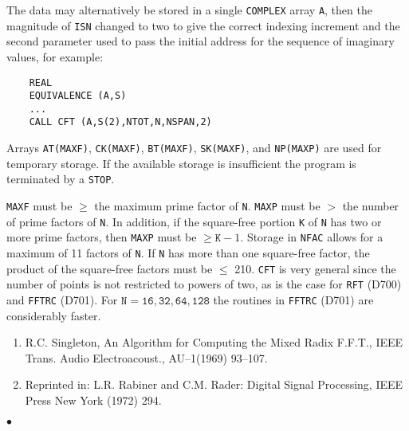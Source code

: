 The data may alternatively be stored in a single {\tt COMPLEX}
array {\tt A}, then the magnitude of {\tt ISN} changed to two to give the
correct indexing increment and the second parameter used to pass
the initial address for the sequence of imaginary values, for
example:
\begin{verbatim}
    REAL
    EQUIVALENCE (A,S)
    ...
    CALL CFT (A,S(2),NTOT,N,NSPAN,2)
\end{verbatim}
Arrays {\tt AT(MAXF)}, {\tt CK(MAXF)}, {\tt BT(MAXF)}, {\tt SK(MAXF)},
and {\tt NP(MAXP)} are used for temporary storage. If the available
storage is insufficient the program is terminated by a {\tt STOP}.
\par
{\tt MAXF}
must be $\geq $ the maximum prime factor of {\tt N}. {\tt MAXP} must be
$>$ the number of prime factors of {\tt N}. In addition, if the
square-free portion {\tt K} of {\tt N} has two or more prime factors,
then {\tt MAXP} must be $\geq \mathtt{K}-1$. Storage in {\tt NFAC} allows
for a maximum of 11 factors of {\tt N}. If {\tt N} has more than one
square-free factor, the product of the square-free factors must be
$\leq$ 210.
\Notes
{\tt CFT} is very general since
the number of points is not restricted to powers of two, as is the
case for {\tt RFT} (D700) and {\tt FFTRC} (D701).
For $\mathtt{N=16,32,64,128}$ the routines in {\tt FFTRC} (D701) are
considerably faster.
\Refer
\begin{enumerate}
\item R.C. Singleton, An Algorithm for Computing the
Mixed Radix F.F.T., IEEE Trans. Audio Electroacoust., AU--1(1969)
93--107.
\item Reprinted in: L.R. Rabiner and C.M. Rader: Digital
Signal Processing,  IEEE Press New York (1972) 294.
\end{enumerate}
$\bullet$
